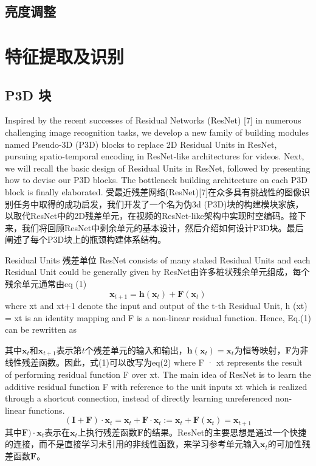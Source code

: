 \subsection{亮度调整}



\section{特征提取及识别}

\subsection{P3D 块}

Inspired by the recent successes of Residual Networks (ResNet) [7] in numerous challenging image recognition tasks, we develop a new family of building modules named Pseudo-3D (P3D) blocks to replace 2D Residual Units in ResNet, pursuing spatio-temporal encoding in ResNet-like architectures for videos. Next, we will recall the basic design of Residual Units in ResNet, followed by presenting how to devise our P3D blocks. The bottleneck building architecture on each P3D block is finally elaborated.
受最近残差网络(ResNet)[7]在众多具有挑战性的图像识别任务中取得的成功启发，我们开发了一个名为伪3d (P3D)块的构建模块家族，以取代ResNet中的2D残差单元，在视频的ResNet-like架构中实现时空编码。接下来，我们将回顾ResNet中剩余单元的基本设计，然后介绍如何设计P3D块。最后阐述了每个P3D块上的瓶颈构建体系结构。

Residual Units
残差单位
ResNet consists of many staked Residual Units and each Residual Unit could be generally given by
ResNet由许多桩状残余单元组成，每个残余单元通常由eq (1)
\begin{equation}
\label{eq6}
   \textbf{x}_{t+1}=\textbf{h}(\textbf{x}_{t})+\textbf{F}(\textbf{x}_{t})
\end{equation}
where xt and xt+1 denote the input and output of the t-th Residual Unit, h (xt) = xt is an identity mapping and F is a non-linear residual function. Hence, Eq.(1) can be rewritten as

其中$\textbf{x}_{t}$和$\textbf{x}_{t+1}$表示第$t$个残差单元的输入和输出，$\textbf{h}(\textbf{x}_{t})=\textbf{x}_{t}$为恒等映射，$\textbf{F}$为非线性残差函数。因此，式(1)可以改写为eq(2)
where F · xt represents the result of performing residual function F over xt. The main idea of ResNet is to learn the additive residual function F with reference to the unit inputs xt which is realized through a shortcut connection, instead of directly learning unreferenced non-linear functions.
\begin{equation}
\label{eq6}
   (\textbf{I}+\textbf{F})\cdot \textbf{x}_{t}=\textbf{x}_{t}+\textbf{F}\cdot \textbf{x}_{t}:=\textbf{x}_{t}+\textbf{F}(\textbf{x}_{t})=\textbf{x}_{t+1}
\end{equation}
其中$\textbf{F})\cdot \textbf{x}_{t}$表示在$\textbf{x}_{t}$上执行残差函数$\textbf{F}$的结果。ResNet的主要思想是通过一个快捷的连接，而不是直接学习未引用的非线性函数，来学习参考单元输入$\textbf{x}_{t}$的可加性残差函数$\textbf{F}$。

